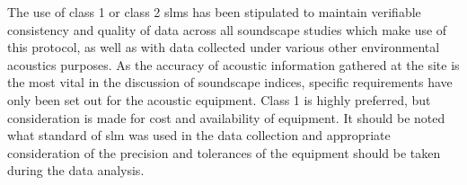    The use of class 1 or class 2 \gls{slm}s has been stipulated to maintain verifiable consistency and quality of data across all soundscape studies which make use of this protocol, as well as with data collected under various other environmental acoustics purposes. As the accuracy of acoustic information gathered at the site is the most vital in the discussion of soundscape indices, specific requirements have only been set out for the acoustic equipment. Class 1 is highly preferred, but consideration is made for cost and availability of equipment. It should be noted what standard of \gls{slm} was used in the data collection and appropriate consideration of the precision and tolerances of the equipment should be taken during the data analysis.




